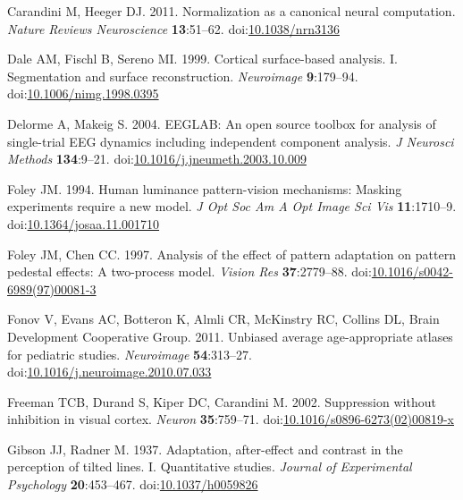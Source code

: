 \documentclass[
]{article}
\newlength{\cslhangindent}
\newlength{\cslentryspacingunit} %
\newenvironment{CSLReferences}[2] %
 {%
  \setlength{\parindent}{0pt}
  \ifodd #1
  \let\oldpar\par
  \def\par{\hangindent=\cslhangindent\oldpar}
  \fi
  \setlength{\parskip}{#2\cslentryspacingunit}
 }%
 {}
\begin{document}
\begin{CSLReferences}{1}{0}
\leavevmode{}%
Carandini M, Heeger DJ. 2011. Normalization as a canonical neural computation. \emph{Nature Reviews Neuroscience} \textbf{13}:51--62. doi:\href{https://doi.org/10.1038/nrn3136}{10.1038/nrn3136}

\leavevmode{}%
Dale AM, Fischl B, Sereno MI. 1999. Cortical surface-based analysis. I. Segmentation and surface reconstruction. \emph{Neuroimage} \textbf{9}:179--94. doi:\href{https://doi.org/10.1006/nimg.1998.0395}{10.1006/nimg.1998.0395}

\leavevmode{}%
Delorme A, Makeig S. 2004. EEGLAB: An open source toolbox for analysis of single-trial EEG dynamics including independent component analysis. \emph{J Neurosci Methods} \textbf{134}:9--21. doi:\href{https://doi.org/10.1016/j.jneumeth.2003.10.009}{10.1016/j.jneumeth.2003.10.009}

\leavevmode{}%
Foley JM. 1994. Human luminance pattern-vision mechanisms: Masking experiments require a new model. \emph{J Opt Soc Am A Opt Image Sci Vis} \textbf{11}:1710--9. doi:\href{https://doi.org/10.1364/josaa.11.001710}{10.1364/josaa.11.001710}

\leavevmode{}%
Foley JM, Chen CC. 1997. Analysis of the effect of pattern adaptation on pattern pedestal effects: A two-process model. \emph{Vision Res} \textbf{37}:2779--88. doi:\href{https://doi.org/10.1016/s0042-6989(97)00081-3}{10.1016/s0042-6989(97)00081-3}

\leavevmode{}%
Fonov V, Evans AC, Botteron K, Almli CR, McKinstry RC, Collins DL, Brain Development Cooperative Group. 2011. Unbiased average age-appropriate atlases for pediatric studies. \emph{Neuroimage} \textbf{54}:313--27. doi:\href{https://doi.org/10.1016/j.neuroimage.2010.07.033}{10.1016/j.neuroimage.2010.07.033}

\leavevmode{}%
Freeman TCB, Durand S, Kiper DC, Carandini M. 2002. Suppression without inhibition in visual cortex. \emph{Neuron} \textbf{35}:759--71. doi:\href{https://doi.org/10.1016/s0896-6273(02)00819-x}{10.1016/s0896-6273(02)00819-x}

\leavevmode{}%
Gibson JJ, Radner M. 1937. Adaptation, after-effect and contrast in the perception of tilted lines. {I}. {Quantitative} studies. \emph{Journal of Experimental Psychology} \textbf{20}:453--467. doi:\href{https://doi.org/10.1037/h0059826}{10.1037/h0059826}


\end{CSLReferences}
\end{document}

